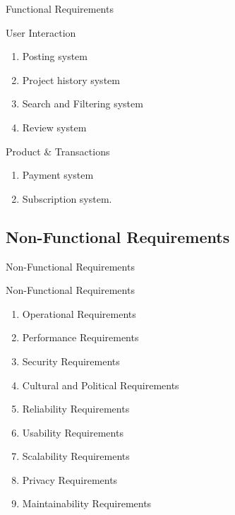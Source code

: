 \documentclass[aspectratio=169]{beamer}
\begin{document}
\begin{frame}{Functional Requirements}
    \begin{block}{User Interaction}
        \begin{enumerate}
            \item Posting system
            \item Project history system
            \item Search and Filtering system
            \item Review system
        \end{enumerate}
    \end{block}
    \begin{exampleblock}{Product \& Transactions}
        \begin{enumerate}
            \item Payment system
            \item Subscription system.
        \end{enumerate}
    \end{exampleblock}
\end{frame}

\subsection{Non-Functional Requirements}
\begin{frame}{Non-Functional Requirements}

    \begin{block}{Non-Functional Requirements}
        \begin{enumerate}
            \item Operational Requirements
            \item Performance Requirements
            \item Security Requirements
            \item Cultural and Political Requirements
            \item Reliability Requirements
            \item Usability Requirements
            \item Scalability Requirements
            \item Privacy Requirements
            \item Maintainability Requirements
        \end{enumerate}
    \end{block}

\end{frame}
\end{document}
